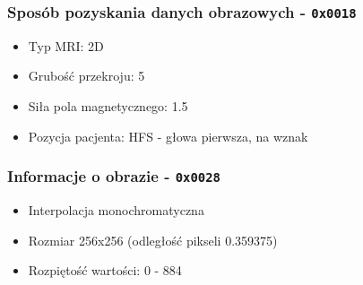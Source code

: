 \begin{frame}
  \frametitle{Sposób pozyskania danych obrazowych - \texttt{0x0018}}

  \begin{itemize}
    \item Typ MRI: 2D
    \item Grubość przekroju: 5
    \item Siła pola magnetycznego: 1.5
    \item Pozycja pacjenta: HFS - głowa pierwsza, na wznak
  \end{itemize}
\end{frame}


\begin{frame}
  \frametitle{Informacje o obrazie - \texttt{0x0028}}
\begin{itemize}
  \item Interpolacja monochromatyczna
  \item Rozmiar 256x256 (odległość pikseli 0.359375)
  \item Rozpiętość wartości: 0 - 884
\end{itemize}
\end{frame}
